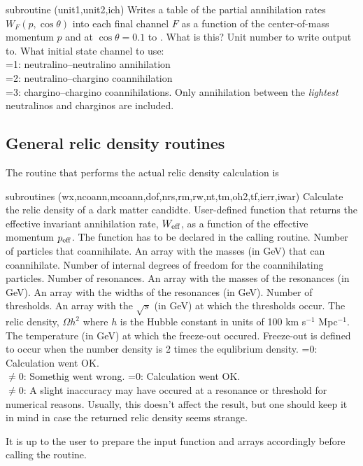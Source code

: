 \begin{sub}{subroutine (unit1,unit2,ich)}
   Writes a table of the partial
    annihilation rates $W_F(p,\cos\theta)$ into each final channel $F$ as a
    function of the center-of-mass momentum $p$ and at $\cos\theta=0.1$ to 
    . 
   What is this?
   Unit number to write output to.
   What initial state channel to use:\\
   =1: neutralino--neutralino annihilation\\
   =2: neutralino--chargino coannihilation\\
   =3: chargino--chargino coannihilations.
   Only annihilation between the \emph{lightest}
    neutralinos and charginos are included.
\end{sub}

\subsection{General relic density routines}

The routine that performs the actual relic density calculation is
\begin{sub}{subroutines
(wx,ncoann,mcoann,dof,nrs,rm,rw,nt,tm,oh2,tf,ierr,iwar)}
   Calculate the relic density of a dark matter
  candidte.
   User-defined function that returns the effective
    invariant annihilation rate, $W_{\rm eff}$, as a function of the
    effective momentum $p_{\rm eff}$. The function has to be declared
     in the calling routine.
   Number of particles that coannihilate.
   An array with the masses (in GeV) that can
    coannihilate.
   Number of internal degrees of freedom for the
  coannihilating particles.
   Number of resonances.
   An array with the masses of the resonances (in GeV).
   An array with the widths of the resonances (in GeV).
   Number of thresholds.
   An array with the $\sqrt{s}$ (in GeV) at which the
    thresholds occur.
   The relic density, $\Omega h^2$ where $h$ is the Hubble
  constant in units of 100 km s$^{-1}$ Mpc$^{-1}$.
   The temperature (in GeV) at which the freeze-out
  occured. Freeze-out is defined to occur when the number density is 2
  times the equlibrium density.
   =0: Calculation went OK.\\
    $\neq0$: Somethig went wrong. 
   =0: Calculation went OK.\\
    $\neq0$: A slight inaccuracy may have occured at a resonance or
    threshold for numerical reasons. Usually, this doesn't affect the
    result, but one should keep it in mind in case the returned relic
    density seems strange.
\end{sub}
It is up to the user to prepare the input function and arrays
accordingly before calling the routine.


